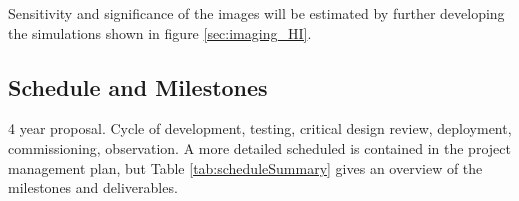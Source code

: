 \documentclass[preprint]{aastex}
\begin{document}
Sensitivity and significance of the images will be estimated by further developing the simulations shown in figure \ref{sec:imaging_HI}.  


%


\subsection{Schedule and Milestones} %

4 year proposal.
Cycle of development, testing, critical design review, deployment, commissioning, observation.
A more detailed scheduled is contained in the project management plan, but Table \ref{tab:scheduleSummary} gives an overview
of the milestones and deliverables.
\end{document}
